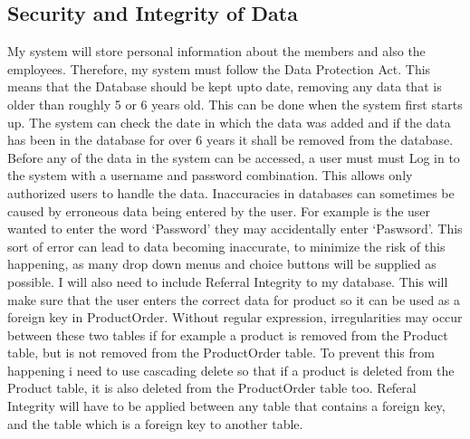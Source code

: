 \begin{python}
\subsection{Security and Integrity of Data}

My system will store personal information about the members and also the employees. Therefore, my system must follow the Data Protection Act. This means that the Database should be kept upto date, removing any data that is older than roughly 5 or 6 years old. This can be done when the system first starts up. The system can check the date in which the data was added and if the data has been in the database for over 6 years it shall be removed from the database. Before any of the data in the system can be accessed, a user must must Log in to the system with a username and password combination. This allows only authorized users to handle the data. Inaccuracies in databases can sometimes be caused by erroneous data being entered by the user. For example is the user wanted to enter the word `Password' they may accidentally enter `Paswsord'. This sort of error can lead to data becoming inaccurate, to minimize the risk of this happening, as many drop down menus and choice buttons will be supplied as possible. I will also need to include Referral Integrity to my database. This will make sure that the user enters the correct data for product so it can be used as a foreign key in ProductOrder. Without regular expression, irregularities may occur between these two tables if for example a product is removed from the Product table, but is not removed from the ProductOrder table. To prevent this from happening i need to use cascading delete so that if a product is deleted from the Product table, it is also deleted from the ProductOrder table too. Referal Integrity will have to be applied between any table that contains a foreign key, and the table which is a foreign key to another table.


\end{python}
